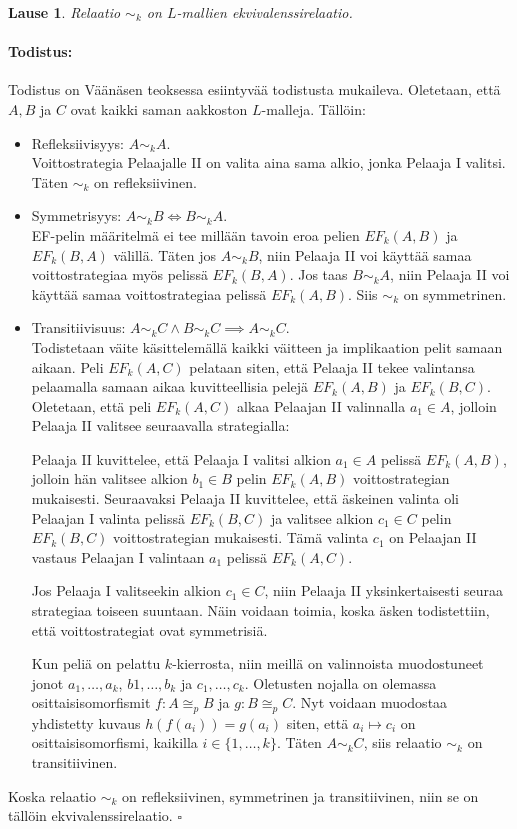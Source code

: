 \documentclass[finnish]{tktltiki2}
\newtheorem{lau}{Lause}
\theoremstyle{definition}
\theoremstyle{remark}
\newenvironment{tod}{\paragraph{Todistus:}}{\hfill$\square$}
\begin{document}
\begin{lau} 
Relaatio $\sim_k$ on $L$-mallien ekvivalenssirelaatio.
\end{lau}
\begin{tod} Todistus on Väänäsen teoksessa \cite{Vaa11} esiintyvää todistusta mukaileva. Oletetaan, että $A, B$ ja $C$ ovat kaikki saman aakkoston $L$-malleja. Tällöin:
\begin{itemize}
\item Refleksiivisyys: $A \sim_k A$.\\
Voittostrategia Pelaajalle II on valita aina sama alkio, jonka Pelaaja I valitsi. Täten $\sim_k$ on refleksiivinen.
\item Symmetrisyys: $A \sim_k B \iff B \sim_k A$.\\
EF-pelin määritelmä ei tee millään tavoin eroa pelien $EF_k(A, B)$ ja $EF_k(B, A)$ välillä. Täten jos $A \sim_k B$, niin Pelaaja II voi käyttää samaa voittostrategiaa myös pelissä $EF_k(B, A)$. Jos taas $B \sim_k A$, niin Pelaaja II voi käyttää samaa voittostrategiaa pelissä $EF_k(A, B)$. Siis $\sim_k$ on symmetrinen.
\item Transitiivisuus: $A \sim_k C \land B \sim_k C \implies A \sim_k C$.\\
Todistetaan väite käsittelemällä kaikki väitteen ja implikaation pelit samaan aikaan. Peli $EF_k(A, C)$ pelataan siten, että Pelaaja II tekee valintansa pelaamalla samaan aikaa kuvitteellisia pelejä $EF_k(A, B)$ ja $EF_k(B, C)$. Oletetaan, että peli $EF_k(A, C)$ alkaa Pelaajan II valinnalla $a_1 \in A$, jolloin Pelaaja II valitsee seuraavalla strategialla:

Pelaaja II kuvittelee, että Pelaaja I valitsi alkion $a_1 \in A$ pelissä $EF_k(A, B)$, jolloin hän valitsee alkion $b_1 \in B$ pelin $EF_k(A, B)$ voittostrategian mukaisesti. Seuraavaksi Pelaaja II kuvittelee, että äskeinen valinta oli Pelaajan I valinta pelissä $EF_k(B, C)$ ja valitsee alkion $c_1 \in C$ pelin $EF_k(B, C)$ voittostrategian mukaisesti. Tämä valinta $c_1$ on Pelaajan II vastaus Pelaajan I valintaan $a_1$ pelissä $EF_k(A, C)$.

Jos Pelaaja I valitseekin alkion $c_1 \in C$, niin Pelaaja II yksinkertaisesti seuraa strategiaa toiseen suuntaan. Näin voidaan toimia, koska äsken todistettiin, että voittostrategiat ovat symmetrisiä.

Kun peliä on pelattu $k$-kierrosta, niin meillä on valinnoista muodostuneet jonot $a_1, \ldots, a_k$, $b1, \ldots, b_k$ ja $c_1, \ldots, c_k$. Oletusten nojalla on olemassa osittaisisomorfismit $f: A \cong_p B$ ja $g: B \cong_p C$. Nyt voidaan muodostaa yhdistetty kuvaus $h(f(a_i)) = g(a_i)$ siten, että $a_i \mapsto c_i$ on osittaisisomorfismi, kaikilla $i \in \{1, \ldots, k\}$. Täten $A \sim_k C$, siis relaatio $\sim_k$ on transitiivinen.
\end{itemize}
Koska relaatio $\sim_k$ on refleksiivinen, symmetrinen ja transitiivinen, niin se on tällöin ekvivalenssirelaatio.
\end{tod}
\\
\end{document}
